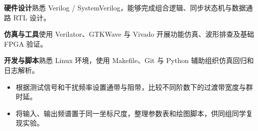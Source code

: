 \begin{skilllist}
  \item \textbf{硬件设计}\quad 熟悉 Verilog / SystemVerilog，能够完成组合逻辑、同步状态机与数据通路 RTL 设计。
  \item \textbf{仿真与工具}\quad 使用 Verilator、GTKWave 与 Vivado 开展功能仿真、波形排查及基础 FPGA 验证。
  \item \textbf{开发与脚本}\quad 熟悉 Linux 环境，使用 Makefile、Git 与 Python 辅助组织仿真回归和日志解析。
\end{skilllist}

\begin{itemize}
  \item 根据测试信号和干扰频率设置通带与阻带，比较不同阶数下的过渡带宽度与群时延。
  \item 将输入、输出频谱置于同一坐标尺度，整理参数表和绘图脚本，供同组同学复现实验。
\end{itemize}





